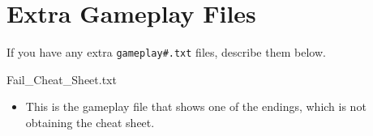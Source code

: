 \documentclass[11pt]{article}
\begin{document}
\begin{enumerate}

\end{enumerate}


\section*{Extra Gameplay Files}

If you have any extra \texttt{gameplay\#.txt} files, describe them below.

\item Fail\_Cheat\_Sheet.txt
    \begin{itemize}
    \item This is the gameplay file that shows one of the endings, which is not obtaining the cheat sheet. 
    \end{itemize}
\end{document}
